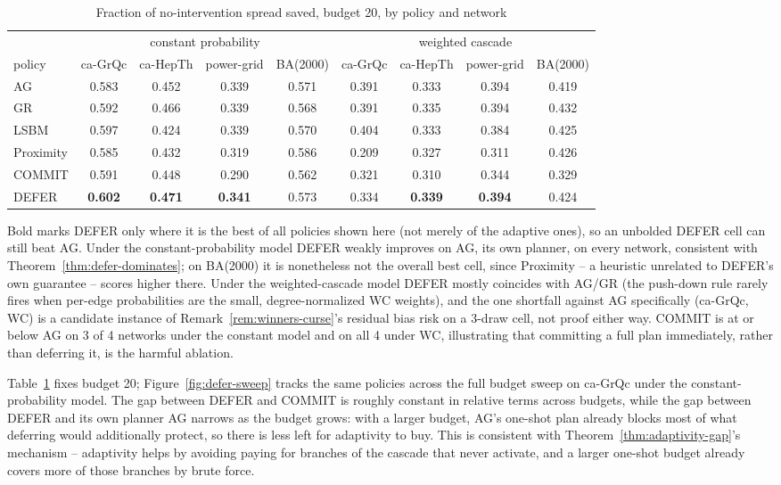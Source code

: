 \documentclass[ASNA,number]{USG}
\newcommand{\up}{\rule{0pt}{2.6ex}}
\newcommand{\down}{\rule[-1.2ex]{0pt}{0pt}}
\begin{document}
\begin{table}[h]
\centering
\caption{Fraction of no-intervention spread saved, budget 20, by policy and network\label{tab:defer-results}}
\begin{tabular}{@{}lcccccccc@{}}
\hline
\up & \multicolumn{4}{c}{constant probability} & \multicolumn{4}{c}{weighted cascade} \\
policy & ca-GrQc & ca-HepTh & power-grid & BA(2000) & ca-GrQc & ca-HepTh & power-grid & BA(2000) \\
\hline
\up AG & 0.583 & 0.452 & 0.339 & 0.571 & 0.391 & 0.333 & 0.394 & 0.419 \\
GR & 0.592 & 0.466 & 0.339 & 0.568 & 0.391 & 0.335 & 0.394 & 0.432 \\
LSBM & 0.597 & 0.424 & 0.339 & 0.570 & 0.404 & 0.333 & 0.384 & 0.425 \\
Proximity & 0.585 & 0.432 & 0.319 & 0.586 & 0.209 & 0.327 & 0.311 & 0.426 \\
COMMIT & 0.591 & 0.448 & 0.290 & 0.562 & 0.321 & 0.310 & 0.344 & 0.329 \\
\down DEFER & \textbf{0.602} & \textbf{0.471} & \textbf{0.341} & 0.573 & 0.334 & \textbf{0.339} & \textbf{0.394} & 0.424 \\
\hline
\end{tabular}
Bold marks DEFER only where it is the best of all policies shown here (not merely of the adaptive ones), so an unbolded DEFER cell can still beat AG. Under the constant-probability model DEFER weakly improves on AG, its own planner, on every network, consistent with Theorem~\ref{thm:defer-dominates}; on BA(2000) it is nonetheless not the overall best cell, since Proximity -- a heuristic unrelated to DEFER's own guarantee -- scores higher there. Under the weighted-cascade model DEFER mostly coincides with AG/GR (the push-down rule rarely fires when per-edge probabilities are the small, degree-normalized WC weights), and the one shortfall against AG specifically (ca-GrQc, WC) is a candidate instance of Remark~\ref{rem:winners-curse}'s residual bias risk on a 3-draw cell, not proof either way. COMMIT is at or below AG on 3 of 4 networks under the constant model and on all 4 under WC, illustrating that committing a full plan immediately, rather than deferring it, is the harmful ablation.
\end{table}

Table~\ref{tab:defer-results} fixes budget 20; Figure~\ref{fig:defer-sweep}
tracks the same policies across the full budget sweep on ca-GrQc under the
constant-probability model. The gap between DEFER and COMMIT is roughly
constant in relative terms across budgets, while the gap between DEFER and
its own planner AG narrows as the budget grows: with a larger budget, AG's
one-shot plan already blocks most of what deferring would additionally
protect, so there is less left for adaptivity to buy. This is consistent
with Theorem~\ref{thm:adaptivity-gap}'s mechanism -- adaptivity helps by
avoiding paying for branches of the cascade that never activate, and a
larger one-shot budget already covers more of those branches by brute
force.
\end{document}
